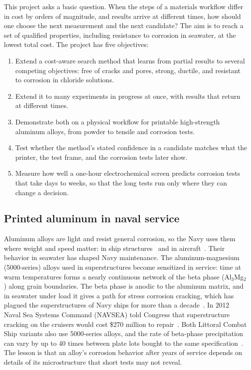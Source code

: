 \documentclass[12pt,letterpaper]{article}
\begin{document}
This project asks a basic question. When the steps of a materials workflow
differ in cost by orders of magnitude, and results arrive at different times,
how should one choose the next measurement and the next candidate? The aim is
to reach a set of qualified properties, including resistance to corrosion in
seawater, at the lowest total cost. The project has five objectives:
\begin{enumerate}\setlength{\itemsep}{0pt}
\item Extend a cost-aware search method that learns from partial results to
several competing objectives: free of cracks and pores, strong, ductile, and
resistant to corrosion in chloride solutions.
\item Extend it to many experiments in progress at once, with results that
return at different times.
\item Demonstrate both on a physical workflow for printable high-strength
aluminum alloys, from powder to tensile and corrosion tests.
\item Test whether the method's stated confidence in a candidate matches what
the printer, the test frame, and the corrosion tests later show.
\item Measure how well a one-hour electrochemical screen predicts corrosion
tests that take days to weeks, so that the long tests run only where they can
change a decision.
\end{enumerate}

\subsection{Printed aluminum in naval service}
\label{sec:naval-al}

Aluminum alloys are light and resist general corrosion, so the Navy uses them
where weight and speed matter: in ship structures~\cite{golumbfskie2016} and
in aircraft~\cite{dursun2014}. Their behavior in seawater has shaped Navy
maintenance. The aluminum-magnesium (5000-series) alloys used in
superstructures become sensitized in service: time at warm temperatures
forms a nearly continuous network of the beta phase
(Al$_3$Mg$_2$) along grain boundaries. The beta phase is anodic to the
aluminum matrix, and in seawater under load it gives a path for stress
corrosion cracking, which has plagued the superstructures of Navy ships for
more than a decade~\cite{golumbfskie2016}. In 2012 Naval Sea Systems Command
(NAVSEA) told Congress that superstructure cracking on the cruisers would
cost \$270 million to repair~\cite{insidedefense2012}. Both Littoral Combat
Ship variants also use 5000-series alloys, and the rate of beta-phase
precipitation can vary by up to 40 times between plate lots bought to the
same specification~\cite{navsea2018sttr}. The lesson is that an alloy's
corrosion behavior after years of service depends on details of its
microstructure that short tests may not reveal.
\end{document}

